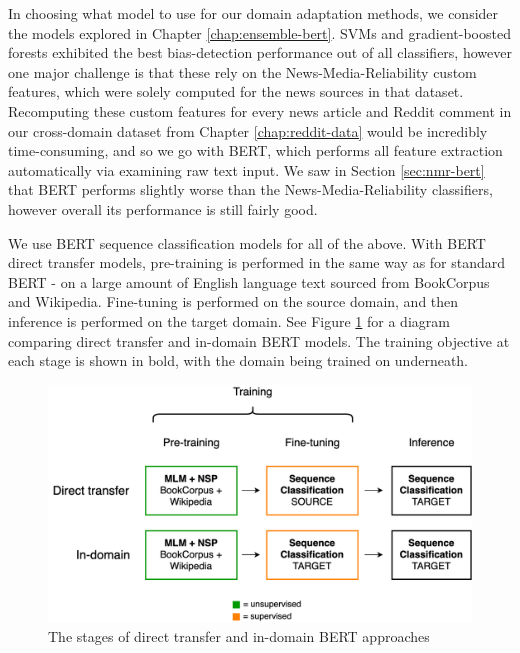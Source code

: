 In choosing what model to use for our domain adaptation methods, we consider the models explored in Chapter \ref{chap:ensemble-bert}. SVMs and gradient-boosted forests exhibited the best bias-detection performance out of all classifiers, however one major challenge is that these rely on the News-Media-Reliability custom features, which were solely computed for the news sources in that dataset. Recomputing these custom features for every news article and Reddit comment in our cross-domain dataset from Chapter \ref{chap:reddit-data} would be incredibly time-consuming, and so we go with BERT, which performs all feature extraction automatically via examining raw text input. We saw in Section \ref{sec:nmr-bert} that BERT performs slightly worse than the News-Media-Reliability classifiers, however overall its performance is still fairly good.

We use BERT sequence classification models for all of the above. With BERT direct transfer models, pre-training is performed in the same way as for standard BERT - on a large amount of English language text sourced from BookCorpus and Wikipedia. Fine-tuning is performed on the source domain, and then inference is performed on the target domain. See Figure \ref{fig:direct-transfer-in-domain-bert} for a diagram comparing direct transfer and in-domain BERT models. The training objective at each stage is shown in bold, with the domain being trained on underneath.

\begin{figure}
    \centering
    \hspace{-1.5cm}
    \includegraphics[scale=0.3]{0-img/direct-transfer-in-domain-bert.png}
    \caption{The stages of direct transfer and in-domain BERT approaches}
    \label{fig:direct-transfer-in-domain-bert}
\end{figure}

